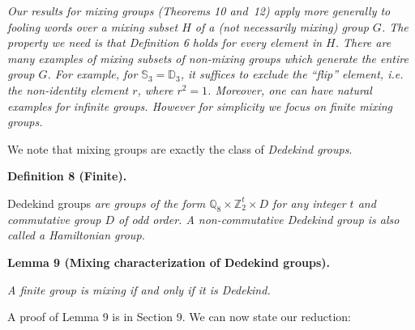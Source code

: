 \documentclass[10pt,a4paper]{article}
\begin{document}
\emph{Our results for mixing groups (Theorems 10 and 12) apply more generally to fooling words over a mixing subset $H$ of a (not necessarily mixing) group $G$. The property we need is that Definition 6 holds for every element in $H$. There are many examples of mixing subsets of non-mixing groups which generate the entire group $G$. For example, for $\mathbb{S}_{3}=\mathbb{D}_{3}$, it suffices to exclude the “flip” element, i.e. the non-identity element $r$, where $r^{2}=1$. Moreover, one can have natural examples for infinite groups. However for simplicity we focus on finite mixing groups.}\par






We note that mixing groups are exactly the class of \emph{Dedekind groups}.\par





\par\medskip\noindent\textbf{
\textbf{Definition 8}\textbf{ }(Finite)\textbf{.}
}\par



Dedekind groups\emph{ are groups of the form $\mathbb{Q}_{8}\times\mathbb{Z}_{2}^{t}\times D$
for any integer $t$ and commutative group $D$ of odd order. A non-commutative Dedekind group is also called a Hamiltonian group.}\par







\par\medskip\noindent\textbf{
\textbf{Lemma 9}\textbf{ }(Mixing characterization of Dedekind groups)\textbf{.}
}\par



\emph{A finite group is mixing if and only if it is Dedekind.}\par






A proof of Lemma 9 is in Section 9.
We can now state our reduction:\par
\end{document}
